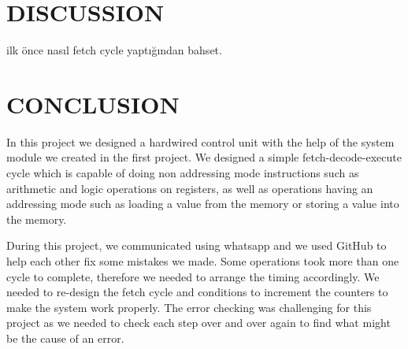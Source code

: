 \documentclass[pdftex,12pt,a4paper]{article}
\begin{document}
\section{DISCUSSION}

ilk önce nasıl fetch cycle yaptığından bahset. 




\section{CONCLUSION}
In this project we designed a hardwired control unit with the help of the system module we created in the
first project. We designed a simple fetch-decode-execute cycle which is capable of doing non addressing
mode instructions such as arithmetic and logic operations on registers, as well as operations having an
addressing mode such as loading a value from the memory or storing a value into the memory.

During this project, we communicated using whatsapp and we used GitHub to help each other fix some 
mistakes we made. Some operations took more than one cycle to complete, therefore we needed to arrange 
the timing accordingly. We needed to re-design the fetch cycle and conditions to increment the counters 
to make the system work properly. The error checking was challenging for this project as we needed to 
check each step over and over again to find what might be the cause of an error. 
\end{document}
